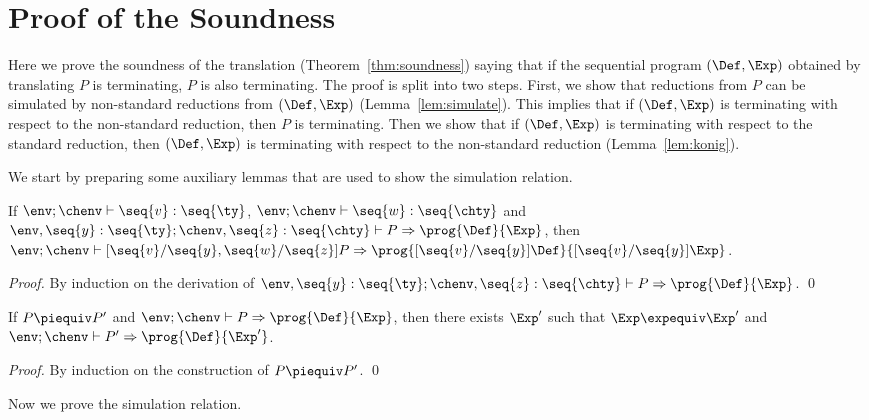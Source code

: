 \section{Proof of the Soundness}  \label{sec:soundness}
Here we prove the soundness of the translation (Theorem~\ref{thm:soundness}) saying that if the sequential program \( (\Def, \Exp) \) obtained by translating \( P \) is terminating, \( P \) is also terminating.
The proof is split into two steps.
First, we show that reductions from \( P \) can be simulated by non-standard reductions from \( (\Def, \Exp ) \) (Lemma~\ref{lem:simulate}).
This implies that if \( (\Def, \Exp) \) is terminating with respect to the non-standard reduction, then \( P \) is terminating.
Then we show that if  \( (\Def, \Exp) \) is terminating with respect to the standard reduction, then \( (\Def, \Exp) \) is terminating with respect to the non-standard reduction (Lemma~\ref{lem:konig}).




We start by preparing some auxiliary lemmas that are used to show the simulation relation.

\begin{lemma}[substitution]
    \label{lem:subst}
    If \( \env; \chenv \vdash \seq{v} : \seq{\ty} \),
       \( \env; \chenv \vdash \seq{w} : \seq{\chty} \)
       and \( \env, \seq{y}:\seq{\ty}; \chenv, \seq{z}:\seq{\chty} \vdash P \Rightarrow
       \prog{\Def}{\Exp} \),
       then \( \env; \chenv \vdash [\seq{v}/\seq{y}, \seq{w} / \seq{z}]P \Rightarrow
       \prog{[\seq{v}/\seq{y}]\Def}{[\seq{v}/\seq{y}] \Exp} \).
\end{lemma}
\begin{proof}
    By induction on the derivation of $\env, \seq{y}:\seq{\ty}; \chenv, \seq{z}:\seq{\chty} \vdash P \Rightarrow \prog{\Def}{\Exp}$.
    \qed
\end{proof}



\begin{lemma} \label{lem:cong}
    If $P \piequiv P'$ and $\env; \chenv \vdash P \Rightarrow \prog{\Def}{\Exp}$,
    then there exists $\Exp'$ such that
    $\Exp \expequiv \Exp'$
    and $\env; \chenv \vdash P' \Rightarrow \prog{\Def}{\Exp'}$.
\end{lemma}
\begin{proof}
    By induction on the construction of $P \piequiv P'$.
    \qed
\end{proof}

Now we prove the simulation relation.

